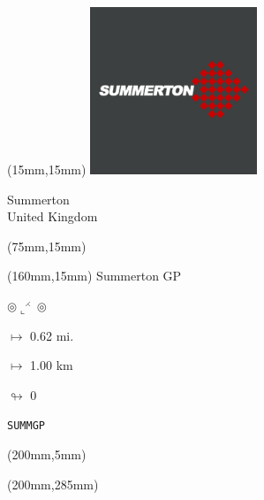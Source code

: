 \begin{textblock*}{50mm}(15mm,15mm)%
\includegraphics[width=50mm]{LG/SUMM.png}
\par Summerton\\ United Kingdom
\end{textblock*}
\begin{textblock*}{80mm}(75mm,15mm)%
\end{textblock*}
\begin{textblock*}{40mm}(160mm,15mm)%
Summerton GP
\par $\circledcirc\llcorner^{\rightthreetimes}\circledcirc$
\Large
\par$\mapsto$ 0.62 mi.
\par$\mapsto$ 1.00 km
\par$\looparrowright$ 0
\par\hfill\tiny\tt SUMMGP\\
\end{textblock*}
\begin{textblock*}{20mm}(200mm,5mm)%
\fbox{\thepage}
\end{textblock*}
\begin{textblock*}{20mm}(200mm,285mm)%
\fbox{\thepage}
\end{textblock*}
